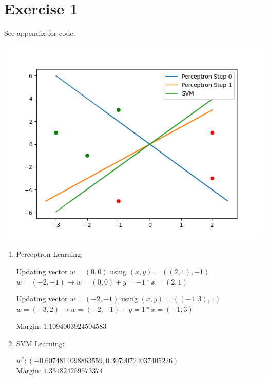 \documentclass[12pt]{article}
\begin{document}
\section*{Exercise 1}
See \refname{appendix} for code.
\begin{center}
	\includegraphics{code/exercise_01.png}
\end{center}
\begin{enumerate}[label=(\alph*)]
	\item	Perceptron Learning: \\
			\bigskip

			Updating vector $w=(0, 0)$ using $(x,y)=((2, 1), -1)$ \\
			$w=(-2, -1) \rightarrow w=(0, 0) + y=-1 * x=(2, 1)$ \\
			\bigskip

			Updating vector $w=(-2, -1)$ using $(x,y)=((-1, 3), 1)$ \\
			$w=(-3, 2) \rightarrow w=(-2, -1) + y=1 * x=(-1, 3)$ \\
			\bigskip

			Margin: $1.1094003924504583$
	\item	SVM Learning: \\
			\bigskip

			$w^*: (-0.6074814098863559, 0.30790724037405226)$ \\
			Margin: $1.331824259573374$
\end{enumerate}
\end{document}

